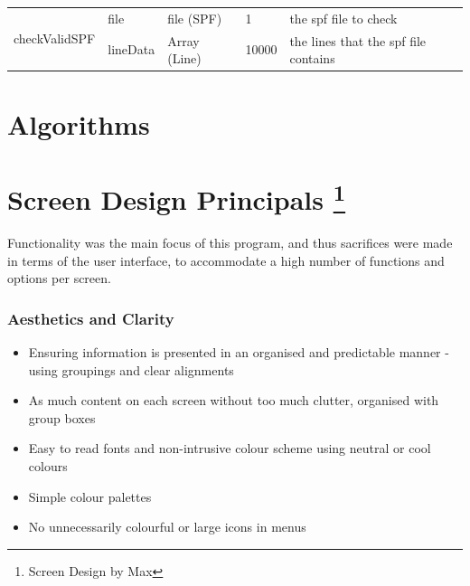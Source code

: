 \documentclass[oneside,openany,11pt,a4paper]{report}
\begin{document}
\begin{longtable}{|p{2cm}|p{3cm}|p{2cm}|p{1cm}|p{6cm}|}
\multirow{2}{*}{\parbox{2cm}{checkValidSPF}}
& file & file (SPF) & 1 & the spf file to check \\
& lineData & Array (Line) & 10000 & the lines that the spf file contains \\ \hline
\end{longtable}
\normalsize



\section{Algorithms}


\pagebreak

\section[Screen Design Principals]{Screen Design Principals \footnote{Screen Design by Max}}

Functionality was the main focus of this program, and thus sacrifices were made in terms of the user interface, to accommodate a high number of functions and options per screen.

\subsubsection{Aesthetics and Clarity}
\begin{itemize}
	\itemsep0em
	\item Ensuring information is presented in an organised and predictable manner - using groupings and clear alignments
	\item As much content on each screen without too much clutter, organised with group boxes
	\item Easy to read fonts and non-intrusive colour scheme using neutral or cool colours
	\item Simple colour palettes
	\item No unnecessarily colourful or large icons in menus
\end{itemize}
\end{document}
